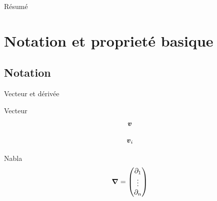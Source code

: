 \date[\today] %
{\today}

\subject{Navier-Stokes}





\setlength{\belowdisplayskip}{0pt}%
\setlength{\abovedisplayskip}{0pt}%
\begin{frame}
  \titlepage
\end{frame}

\begin{frame}[shrink]{Résumé}
  \tableofcontents[pausesections]
\end{frame}

\section{Notation et proprieté basique}
\subsection{Notation}
\begin{frame}{Vecteur et dérivée}
 
 \begin{block}{Vecteur}
  \begin{equation*}
   {\boldsymbol {v}}
  \end{equation*}

  \begin{equation*}
   {\boldsymbol {v}}_{i}
  \end{equation*}

 \end{block}

\begin{block}{Nabla}
 \begin{equation*}
  {\boldsymbol {\nabla}}=\begin{pmatrix}
                 \partial_1\\
                 \vdots \\
                 \partial_n
                \end{pmatrix}
 \end{equation*}
\end{block}
\end{frame}


